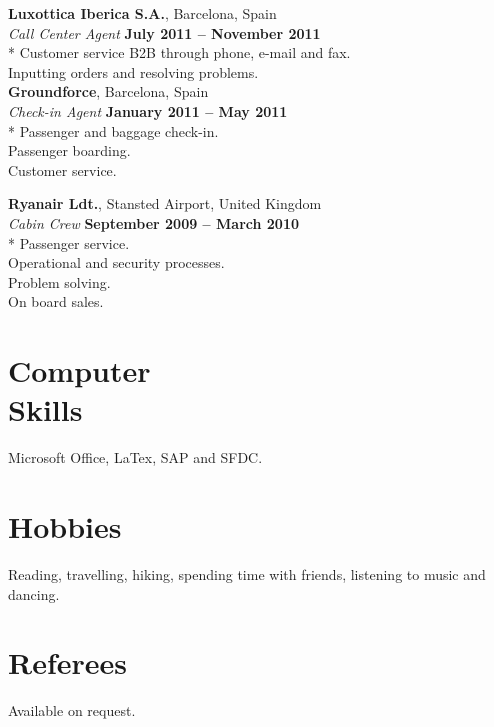 \documentclass[margin,line]{resume}
\begin{document}
\begin{resume}
    \textbf{Luxottica Iberica S.A.}, Barcelona, Spain \vspace{2mm}\\\vspace{1mm}%
    \textsl{Call Center Agent} \hfill \textbf{July 2011 -- November 2011}\\*
    Customer service B2B through phone, e-mail and fax. \vspace{1mm}\\%
    Inputting orders and resolving problems. \vspace{1mm}\\%

    \textbf{Groundforce}, Barcelona, Spain \vspace{2mm}\\\vspace{1mm}%
    \textsl{Check-in Agent} \hfill \textbf{January 2011 -- May 2011}\\*
    Passenger and baggage check-in. \vspace{1mm}\\%
    Passenger boarding. \vspace{1mm}\\%
    Customer service. \vspace{1mm}\\%
    \clearpage

    \textbf{Ryanair Ldt.}, Stansted Airport, United Kingdom \vspace{2mm}\\\vspace{1mm}%
    \textsl{Cabin Crew} \hfill \textbf{September 2009 -- March 2010}\\*
    Passenger service. \vspace{1mm}\\%
    Operational and security processes. \vspace{1mm}\\%
    Problem solving. \vspace{1mm}\\%
    On board sales. \vspace{1mm}\\%
    
 
    \section{\mysidestyle Computer \\Skills}
    Microsoft Office, LaTex, SAP and SFDC. 
    
    \section{\mysidestyle Hobbies}
    Reading, travelling, hiking, spending time with friends, listening to music and dancing.

    \section{\mysidestyle Referees} 
    Available on request.
    


\end{resume}
\end{document}
